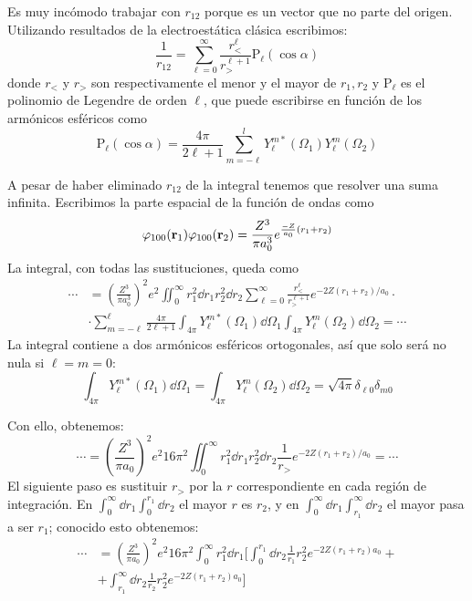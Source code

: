 Es muy incómodo trabajar con $r_{12}$ porque es un vector que no parte
del origen. Utilizando resultados de la electroestática clásica
escribimos:
\begin{equation}
  \frac{1}{r_{12}} = \sum_{\ell=0}^\infty \frac{r_<^\ell}{r_>^{\ell+1}} \text{P}_\ell(\cos\alpha)
\end{equation}
donde $r_<$ y $r_>$ son respectivamente el menor y el mayor de $r_1,r_2$
y $\text{P}_\ell$ es el polinomio de Legendre de orden $\ell$, que puede
escribirse en función de los armónicos esféricos como
\begin{equation}
  \text{P}_\ell (\cos \alpha) = \frac{4\pi}{2\ell+1} \sum_{m=-\ell}^l
  Y_\ell^{m*}(\Omega_1) Y_\ell^{m}(\Omega_2)
\end{equation}

A pesar de
haber eliminado $r_{12}$ de la integral tenemos que resolver una suma
infinita. Escribimos la parte espacial de la función de ondas como
\begin{equation}
  \varphi_{100}(\bm{\mathrm{r}}_1) \varphi_{100}(\bm{\mathrm{r}}_2) = \frac{Z^3}{\pi
    a_0^3} e^{\frac{-Z}{a_0}(r_1+r_2)}
\end{equation}
La integral, con todas las sustituciones, queda como
\begin{equation}
  \begin{split}
    \cdots &= \left( \frac{Z^3}{\pi a_0^3} \right)^2 e^{2}
    \iint_0^\infty r_1^2\dd{r_1}r_2^2\dd{r_2} \sum_{\ell=0}^\infty
    \frac{r_<^\ell}{r_>^{\ell+1}} e^{-2Z(r_1+r_2)/a_0} \cdot \\ &\cdot\sum_{m=-\ell}^\ell
    \frac{4\pi}{2\ell+1}\int_{4\pi} Y_\ell^{m*}(\Omega_1) \dd{\Omega_1}
    \int_{4\pi} Y_\ell^{m}(\Omega_2) \dd{\Omega_2} = \cdots
  \end{split}
\end{equation}
La integral contiene a dos armónicos esféricos ortogonales, así que
solo será no nula si $\ell=m=0$:
\begin{equation}
  \int_{4\pi}Y_\ell^{m*}(\Omega_1) \dd{\Omega_1} = \int_{4\pi}
  Y_\ell^m(\Omega_2) \dd{\Omega_2} = \sqrt{4\pi} \delta_{\ell0} \delta_{m0}
\end{equation}

Con ello, obtenemos:
\begin{equation}
  \cdots = \left( \frac{Z^3}{\pi a_0} \right)^2 e^{2} 16 \pi^2
  \iint_0^\infty r_1^2 \dd{r_1} r_2^2 \dd{r_2} \frac{1}{r_>}
  e^{-2Z(r_1+r_2)/a_0} = \cdots
\end{equation}
El siguiente paso es sustituir $r_>$ por la $r$ correspondiente en
cada región de integración. En $\int_0^\infty \dd{r_1} \int_0^{r_1} \dd{r_2}$ el mayor $r$
es $r_2$, y en $\int_0^\infty \dd{r_1} \int_{r_1}^\infty \dd{r_2}$ el
mayor pasa a ser $r_1$; conocido esto obtenemos:
\begin{equation}
  \begin{split}
    \cdots &= \left( \frac{Z^3}{\pi a_0} \right)^2 e^{2} 16
    \pi^2\int_0^\infty r_1^2 \dd{r_1} \Big[ \int_0^{r_1} \dd{r_2}
      \frac{1}{r_1} r_2^2 e^{-2Z(r_1+r_2)a_0} + \\ &+ \int_{r_1}^\infty
      \dd{r_2} \frac{1}{r_2} r_2^2 e^{-2Z(r_1+r_2)a_0} \Big] 
  \end{split}
\end{equation}

